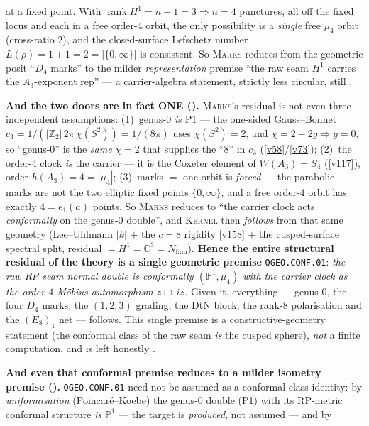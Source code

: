 \documentclass[11pt,a4paper]{article}
\newcommand{\Nfam}{N_{\mathrm{fam}}}
\newcommand{\PP}{\mathbb P^1}
\newcommand{\Z}{\mathbb Z}
\begin{document}
\begin{keybox}
at a fixed point. With $\operatorname{rank}H^1=n-1=3\Rightarrow n=4$ punctures, all off the fixed locus and
each in a free order-$4$ orbit, the only possibility is a \emph{single} free $\mu_4$ orbit (cross-ratio $2$),
and the closed-surface Lefschetz number $L(\rho)=1+1=2=|\{0,\infty\}|$ is consistent. So \textsc{Marks}
reduces from the geometric posit ``$D_4$ marks'' to the milder \emph{representation} premise ``the raw seam
$H^1$ carries the $A_3$-exponent rep'' --- a carrier-algebra statement, strictly less circular, still \mO.
\par\smallskip\noindent\textbf{And the two doors are in fact ONE
().} \textsc{Marks}'s residual is not even three independent
assumptions: (1)~genus-$0$ \emph{is} P1 --- the one-sided Gauss--Bonnet $c_3=1/(|\Z_2|\,2\pi\,\chi(S^2))
=1/(8\pi)$ uses $\chi(S^2)=2$, and $\chi=2-2g\Rightarrow g=0$, so ``genus-$0$'' is the \emph{same}
$\chi=2$ that supplies the ``$8$'' in $c_3$ (\vref{v58}/\vref{v73}); (2)~the order-$4$ clock \emph{is}
the carrier --- it is the Coxeter element of $W(A_3)=S_4$ (\vref{v117}), order $h(A_3)=4=|\mu_4|$;
(3)~marks $=$ one orbit is \emph{forced} --- the parabolic marks are not the two elliptic fixed points
$\{0,\infty\}$, and a free order-$4$ orbit has exactly $4=e_1(a)$ points. So \textsc{Marks} reduces to
``the carrier clock acts \emph{conformally} on the genus-$0$ double'', and \textsc{Kernel} then
\emph{follows} from that same geometry (Lee--Uhlmann $|k|$ $+$ the $c=8$ rigidity \vref{v158} $+$ the
cusped-surface spectral split, residual $=H^1=\mathbb C^3=\Nfam$). \textbf{Hence the entire structural residual
of the theory is a single geometric premise} \texttt{QGEO.CONF.01}: \emph{the raw RP seam normal double
is conformally $(\PP,\mu_4)$ with the carrier clock as the order-$4$ M\"obius automorphism $z\mapsto iz$.}
Given it, everything --- genus-$0$, the four $D_4$ marks, the $(1,2,3)$ grading, the DtN block, the
rank-$8$ polarisation and the $(E_8)_1$ net --- follows. This single premise is a constructive-geometry
statement (the conformal class of the raw seam \emph{is} the cusped sphere), \emph{not} a finite
computation, and is left honestly \mO.
\par\smallskip\noindent\textbf{And even that conformal premise reduces to a milder isometry premise
().} \texttt{QGEO.CONF.01} need not be assumed as a conformal-class
identity: by \emph{uniformisation} (Poincar\'e--Koebe) the genus-$0$ double (P1) with its RP-metric
conformal structure \emph{is} $\PP$ --- the target is \emph{produced}, not assumed --- and by

\end{keybox}
\end{document}
